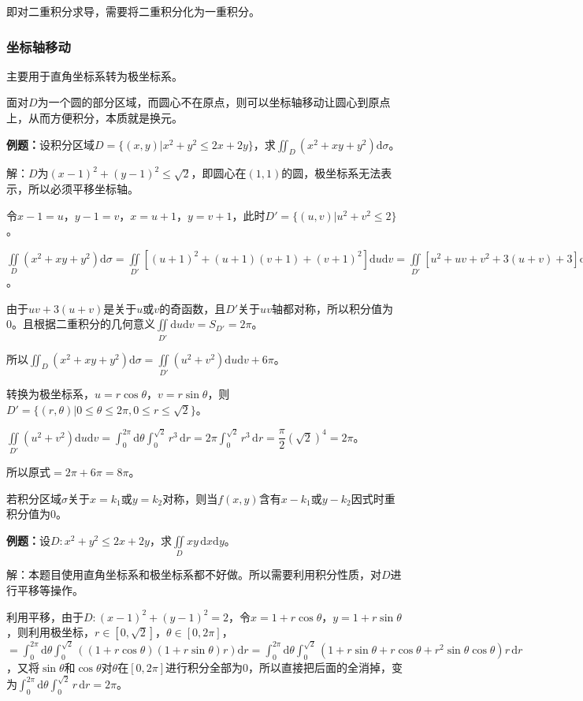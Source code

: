 \documentclass[UTF8, 12pt]{ctexart}
\begin{document}
即对二重积分求导，需要将二重积分化为一重积分。

\subsubsection{坐标轴移动}

主要用于直角坐标系转为极坐标系。

面对$D$为一个圆的部分区域，而圆心不在原点，则可以坐标轴移动让圆心到原点上，从而方便积分，本质就是换元。

\textbf{例题：}设积分区域$D=\{(x,y)\vert x^2+y^2\leqslant2x+2y\}$，求$\iint_D(x^2+xy+y^2)\textrm{d}\sigma$。

解：$D$为$(x-1)^2+(y-1)^2\leqslant\sqrt{2}$，即圆心在$(1,1)$的圆，极坐标系无法表示，所以必须平移坐标轴。

令$x-1=u$，$y-1=v$，$x=u+1$，$y=v+1$，此时$D'=\{(u,v)|u^2+v^2\leqslant2\}$。

$\iint\limits_D(x^2+xy+y^2)\textrm{d}\sigma=\iint\limits_{D'}[(u+1)^2+(u+1)(v+1)+(v+1)^2]\textrm{d}u\textrm{d}v=\iint\limits_{D'}[u^2+uv+v^2+3(u+v)+3]\textrm{d}u\textrm{d}v=\iint\limits_{D'}(u^2+v^2)\textrm{d}u\textrm{d}v+\iint\limits_{D'}[uv+3(u+v)]\textrm{d}u\textrm{d}v+3\iint_{D'}\textrm{d}u\textrm{d}v$。

由于$uv+3(u+v)$是关于$u$或$v$的奇函数，且$D'$关于$uv$轴都对称，所以积分值为0。且根据二重积分的几何意义$\iint\limits_{D'}\textrm{d}u\textrm{d}v=S_{D'}=2\pi$。

所以$\iint_D(x^2+xy+y^2)\textrm{d}\sigma=\iint\limits_{D'}(u^2+v^2)\textrm{d}u\textrm{d}v+6\pi$。

转换为极坐标系，$u=r\cos\theta$，$v=r\sin\theta$，则$D'=\{(r,\theta)|0\leqslant\theta\leqslant2\pi,0\leqslant r\leqslant\sqrt{2}\}$。

$\iint\limits_{D'}(u^2+v^2)\textrm{d}u\textrm{d}v=\int_0^{2\pi}\textrm{d}\theta\int_0^{\sqrt{2}}r^3\,\textrm{d}r=2\pi\int_0^{\sqrt{2}}r^3\,\textrm{d}r=\dfrac{\pi}{2}(\sqrt{2})^4=2\pi$。

所以原式$=2\pi+6\pi=8\pi$。

若积分区域$\sigma$关于$x=k_1$或$y=k_2$对称，则当$f(x,y)$含有$x-k_1$或$y-k_2$因式时重积分值为0。

\textbf{例题：}设$D:x^2+y^2\leqslant2x+2y$，求$\iint\limits_Dxy\,\textrm{d}x\textrm{d}y$。

解：本题目使用直角坐标系和极坐标系都不好做。所以需要利用积分性质，对$D$进行平移等操作。

利用平移，由于$D:(x-1)^2+(y-1)^2=2$，令$x=1+r\cos\theta$，$y=1+r\sin\theta$，则利用极坐标，$r\in[0,\sqrt{2}]$，$\theta\in[0,2\pi]$，$=\int_0^{2\pi}\textrm{d}\theta\int_0^{\sqrt{2}}((1+r\cos\theta)(1+r\sin\theta)r)\textrm{d}r=\int_0^{2\pi}\textrm{d}\theta\int_0^{\sqrt{2}}(1+r\sin\theta+r\cos\theta+r^2\sin\theta\cos\theta)r\,\textrm{d}r$，又将$\sin\theta$和$\cos\theta$对$\theta$在$[0,2\pi]$进行积分全部为0，所以直接把后面的全消掉，变为$\int_0^{2\pi}\textrm{d}\theta\int_0^{\sqrt{2}}r\,\textrm{d}r=2\pi$。
\end{document}
